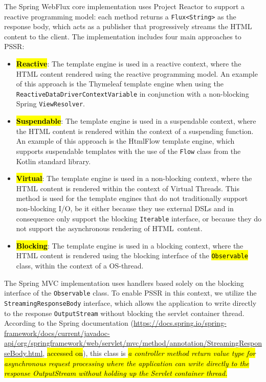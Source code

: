 \documentclass[software,article,accept,pdftex,moreauthors]{Definitions/mdpi}
\begin{document}
The Spring WebFlux core implementation uses Project Reactor to support a
reactive programming model: each method returns a \texttt{Flux<String>} as the
response body, which acts as a publisher that progressively streams the HTML
content to the client. The implementation includes four main approaches to
PSSR\@:
\begin{itemize}
      \item \textbf{\hl{Reactive}}: The template engine is used in a reactive context,
            where the HTML content rendered using the reactive programming model.
            An example of this approach is the Thymeleaf template engine
            when using the \texttt{ReactiveDataDriverContextVariable} in conjunction with a
            non-blocking Spring \texttt{ViewResolver}.
      \item \textbf{\hl{Suspendable}}: The template engine is used in a suspendable
            context, where the HTML content is rendered within the context of a suspending function.
            An example of this approach is the HtmlFlow template engine, which
            supports suspendable templates with the use of the \texttt{Flow} class from the
            Kotlin standard library.
      \item \textbf{\hl{Virtual}}: The template engine is used in a non-blocking
            context, where the HTML content is rendered within the context of Virtual
            Threads. This method is used for the template engines that do not traditionally
            support non-blocking I/O, be it either because they use external DSLs and in
            consequence only support the blocking \texttt{Iterable} interface, or
            because they do not support the asynchronous rendering of HTML~content.
      \item \textbf{\hl{Blocking}}: The template engine is used in a blocking
            context, where the HTML content is rendered using the blocking interface of the
            \texttt{\hl{Observable}} class, within the context of a OS-thread.
\end{itemize}

The Spring MVC implementation uses handlers based solely on the blocking
interface of the \texttt{Observable} class. To enable PSSR in this context, we
utilize the \texttt{StreamingResponseBody} interface, which allows the
application to write directly to the response \texttt{OutputStream} without
blocking the servlet container thread. According to the Spring documentation ({\url{https://docs.spring.io/spring-framework/docs/current/javadoc-api/org/springframework/web/servlet/mvc/method/annotation/StreamingResponseBody.html}}, \hl{accessed on}),
this class is \textit{\hl{a controller method return value type for asynchronous
request processing where the application can write directly to the response
OutputStream without holding up the Servlet container thread.}}
\end{document}
